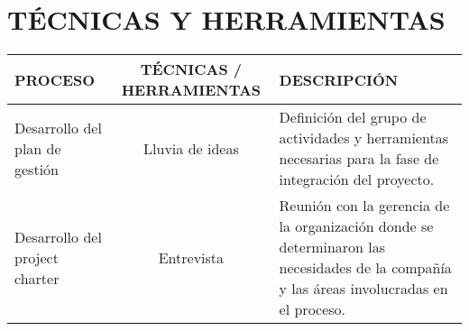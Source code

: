 \chapter{T\'ECNICAS Y HERRAMIENTAS}
%
\begin{table}[H]
	\centering
	\begin{tabular}{| m{5cm} | c | p{5cm} |}
	\hline
	\rowcolor{LightGrey}
	\textbf{PROCESO} & \textbf{T\'ECNICAS / HERRAMIENTAS} & \textbf{DESCRIPCI\'ON} \\ \hline
	Desarrollo del plan de gesti\'on & Lluvia de ideas & Definici\'on del grupo de actividades y herramientas 
	necesarias para la fase de integraci\'on del proyecto.\\
	\hline
	Desarrollo del project charter & Entrevista & Reuni\'on con la gerencia de la organizaci\'on
	donde se determinaron las necesidades de la compa\~n\'ia y las \'areas involucradas en el proceso. \\ 
	\hline
	\end{tabular}
\end{table}